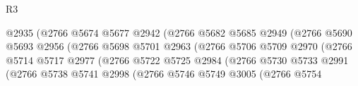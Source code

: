 \begin{lexlean}{R3}
\begin{coremodule}
                                            @2935
                                            (@2766
                                              @5674
                                              @5677
                                              @2942
                                              (@2766
                                                @5682
                                                @5685
                                                @2949
                                                (@2766
                                                  @5690
                                                  @5693
                                                  @2956
                                                  (@2766
                                                    @5698
                                                    @5701
                                                    @2963
                                                    (@2766
                                                      @5706
                                                      @5709
                                                      @2970
                                                      (@2766
                                                        @5714
                                                        @5717
                                                        @2977
                                                        (@2766
                                                          @5722
                                                          @5725
                                                          @2984
                                                          (@2766
                                                            @5730
                                                            @5733
                                                            @2991
                                                            (@2766
                                                              @5738
                                                              @5741
                                                              @2998
                                                              (@2766
                                                                @5746
                                                                @5749
                                                                @3005
                                                                (@2766
                                                                  @5754

\end{coremodule}
\end{lexlean}

